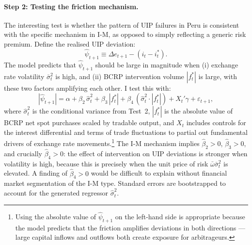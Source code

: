 \documentclass[12pt,a4paper]{article}
\begin{document}
\paragraph{Step 2: Testing the friction mechanism.} The interesting test is whether the pattern of UIP failures in Peru is consistent with the specific mechanism in I-M, as opposed to simply reflecting a generic risk premium. Define the realised UIP deviation:
\begin{equation}
    \hat{\psi}_{t+1} \equiv \Delta e_{t+1} - (i_t - i^*_t).
    \label{eq:uip_dev}
\end{equation}
The model predicts that $\hat{\psi}_{t+1}$ should be large in magnitude when (i) exchange rate volatility $\bar{\sigma}^2_t$ is high, and (ii) BCRP intervention volume $|f^*_t|$ is large, with these two factors amplifying each other. I test this with:
\begin{equation}
    |\hat{\psi}_{t+1}| = \alpha + \beta_2\, \hat{\sigma}^2_t + \beta_3\, |f^*_t| + \beta_4\, \left(\hat{\sigma}^2_t \cdot |f^*_t|\right) + X_t'\gamma + \varepsilon_{t+1},
    \label{eq:uip_mechanism}
\end{equation}
where $\hat{\sigma}^2_t$ is the conditional variance from Test~2, $|f^*_t|$ is the absolute value of BCRP net spot purchases scaled by tradable output, and $X_t$ includes controls for the interest differential and terms of trade fluctuations to partial out fundamental drivers of exchange rate movements.\footnote{Using the absolute value of $\hat{\psi}_{t+1}$ on the left-hand side is appropriate because the model predicts that the friction amplifies deviations in both directions — large capital inflows and outflows both create exposure for arbitrageurs.} The I-M mechanism implies $\hat{\beta}_2 > 0$, $\hat{\beta}_3 > 0$, and crucially $\hat{\beta}_4 > 0$: the effect of intervention on UIP deviations is stronger when volatility is high, because this is precisely when the unit price of risk $\bar{\omega}\bar{\sigma}^2_t$ is elevated. A finding of $\hat{\beta}_4 > 0$ would be difficult to explain without financial market segmentation of the I-M type. Standard errors are bootstrapped to account for the generated regressor $\hat{\sigma}^2_t$.
\end{document}
